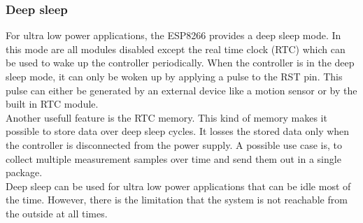 \subsubsection{Deep sleep}
For ultra low power applications, the ESP8266 provides a deep sleep mode.
In this mode are all modules disabled except the real time clock (RTC) which can be used to wake up the controller periodically.
When the controller is in the deep sleep mode, it can only be woken up by applying a pulse to the RST pin.
This pulse can either be generated by an external device like a motion sensor or by the built in RTC module.\\
Another usefull feature is the RTC memory. This kind of memory makes it possible to store data over deep sleep cycles.
It losses the stored data only when the controller is disconnected from the power supply.
A possible use case is, to collect multiple measurement samples over time and send them out in a single package.\\
Deep sleep can be used for ultra low power applications that can be idle most of the time. 
However, there is the limitation that the system is not reachable from the outside at all times. \cite{espressif_inc_esp8266_2016}